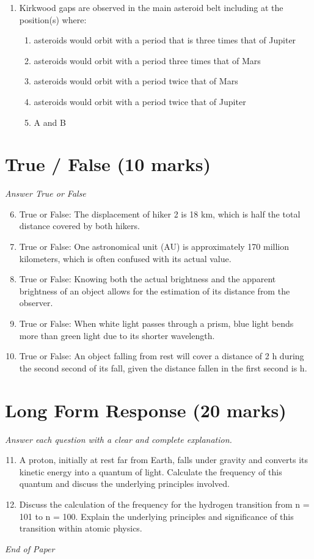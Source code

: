 \documentclass[12pt]{article}
\begin{document}
\begin{enumerate}[label=\arabic*.]
\begin{enumerate}[label=(\alph*)]
    \item taller
\end{enumerate}
\item Kirkwood gaps are observed in the main asteroid belt including at the position(s) where:
\begin{enumerate}[label=(\alph*)]
    \item asteroids would orbit with a period that is three times that of Jupiter
    \item asteroids would orbit with a period three times that of Mars
    \item asteroids would orbit with a period twice that of Mars
    \item asteroids would orbit with a period twice that of Jupiter
    \item A and B
\end{enumerate}
\end{enumerate}

\section*{True / False (10 marks)}
\textit{Answer True or False}
\begin{enumerate}[label=\arabic*.]
\setcounter{enumi}{5}
\item True or False: The displacement of hiker 2 is 18 km, which is half the total distance covered by both hikers.
\item True or False: One astronomical unit (AU) is approximately 170 million kilometers, which is often confused with its actual value.
\item True or False: Knowing both the actual brightness and the apparent brightness of an object allows for the estimation of its distance from the observer.
\item True or False: When white light passes through a prism, blue light bends more than green light due to its shorter wavelength.
\item True or False: An object falling from rest will cover a distance of 2 h during the second second of its fall, given the distance fallen in the first second is h.
\end{enumerate}

\section*{Long Form Response (20 marks)}
\textit{Answer each question with a clear and complete explanation.}
\begin{enumerate}[label=\arabic*.]
\setcounter{enumi}{10}
\item A proton, initially at rest far from Earth, falls under gravity and converts its kinetic energy into a quantum of light. Calculate the frequency of this quantum and discuss the underlying principles involved.
\item Discuss the calculation of the frequency for the hydrogen transition from n = 101 to n = 100. Explain the underlying principles and significance of this transition within atomic physics.
\end{enumerate}

\vfill
\noindent\textit{End of Paper}
\end{document}
